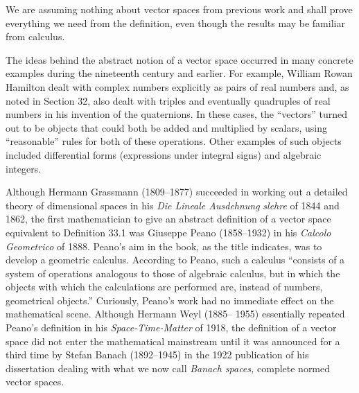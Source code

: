 \documentclass[11pt,oneside]{article}
\begin{document}
\begin{BookBody}
We are assuming nothing about vector spaces from previous work and shall prove everything we need from the definition, even though the results may be familiar from calculus.


\noindent The ideas behind the abstract notion of a vector space occurred in many concrete examples during the nineteenth century and earlier. For example, William Rowan Hamilton dealt with complex numbers explicitly as pairs of real numbers and, as noted in Section 32, also dealt with triples and eventually quadruples of real numbers in his invention of the quaternions. In these cases, the “vectors” turned out to be objects that could both be added and multiplied by scalars, using “reasonable” rules for both of these operations. Other examples of such objects included differential forms (expressions under integral signs) and algebraic integers.

\noindent Although Hermann Grassmann (1809–1877) succeeded in working out a detailed theory of  dimensional spaces in his\textit{ Die Lineale Ausdehnung} \textit{slehre} of 1844 and 1862, the first mathematician to give an abstract definition of a vector space equivalent to Definition 33.1 was Giuseppe Peano (1858–1932) in his\textit{ Calcolo Geometrico} of 1888. Peano’s aim in the book, as the title indicates, was to develop a geometric calculus. According to Peano, such a calculus “consists of a system of operations analogous to those of algebraic calculus, but in which the objects with which the calculations are performed are, instead of numbers, geometrical objects.” Curiously, Peano’s work had no immediate effect on the mathematical scene. Although Hermann Weyl (1885– 1955) essentially repeated Peano’s definition in his \textit{Space-Time-Matter} of 1918, the definition of a vector space did not enter the mathematical mainstream until it was announced for a third time by Stefan Banach (1892–1945) in the 1922 publication of his dissertation dealing with what we now call\textit{ Banach spaces,} complete normed vector spaces.

\end{BookBody}

\BookNarrativetrue
\end{document}
